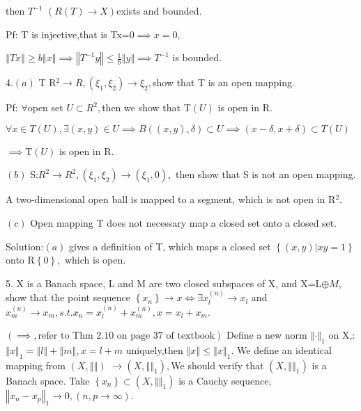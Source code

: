\documentclass{ctexart}
\begin{document}
then $T^{-1}$ $\left( R\left( T\right) \rightarrow X\right) $exists and
bounded.

Pf: T is injective,that is Tx=0$\implies x=0,$

\bigskip $\left\Vert Tx\right\Vert \geq b\left\Vert x\right\Vert \implies
\left\Vert T^{-1}y\right\Vert \leq \frac{1}{b}\left\Vert y\right\Vert
\implies T^{-1}$ is bounded.

4.$\left( a\right) $ T R$^{2}\rightarrow R,\left( \xi _{1},\xi _{2}\right)
\rightarrow \xi _{2},$show that T is an open mapping.

Pf: $\forall $open set $U\subset R^{2},$then we show that T$\left( U\right) $
is open in R.

$\forall x\in T\left( U\right) ,\exists \left( x,y\right) \in U\implies
B\left( \left( x,y\right) ,\delta \right) \subset U\implies \left( x-\delta
,x+\delta \right) \subset T\left( U\right) $

$\implies $T$\left( U\right) $ is open in R.

$\left( b\right) $ S:$R^{2}\rightarrow R^{2},\left( \xi _{1},\xi _{2}\right)
\rightarrow \left( \xi _{1},0\right) ,$ then show that S is not an open
mapping.

A two-dimensional open ball is mapped to a segment, which is not open in R$%
^{2}.$

$\left( c\right) $ Open mapping T does not necessary map a closed set onto a
closed set.

Solution:$\left( a\right) $ gives a definition of T, which maps a closed set 
$\left\{ \left( x,y\right) |xy=1\right\} $ onto R\TEXTsymbol{\backslash}$%
\left\{ 0\right\} ,$ which is open.

5. X is a Banach space, L and M are two closed subspaces of X, and X=L$%
\oplus M,$show that the point sequence $\left\{ x_{n}\right\} \rightarrow
x\iff \exists x_{l}^{\left( n\right) }\rightarrow x_{l}$ and $x_{m}^{\left(
n\right) }\rightarrow x_{m},s.t.x_{n}=x_{l}^{\left( n\right) }+x_{m}^{\left(
n\right) },x=x_{l}+x_{m}.$

$\left( \implies ,\text{refer to Thm 2.10 on page 37 of textbook}\right) $%
Define a new norm $\left\Vert \cdot \right\Vert _{1}$ on X,:$\left\Vert
x\right\Vert _{1}=\left\Vert l\right\Vert +\left\Vert m\right\Vert ,x=l+m$
uniquely,then $\left\Vert x\right\Vert \leq \left\Vert x\right\Vert _{1}.$
We define an identical mapping from $\left( X,\left\Vert {}\right\Vert
\right) $ $\rightarrow \left( X,\left\Vert {}\right\Vert _{1}\right) ,$We
should verify that $\left( X,\left\Vert {}\right\Vert _{1}\right) $ is a
Banach space. Take $\left\{ x_{n}\right\} \subset \left( X,\left\Vert
{}\right\Vert _{1}\right) $ is a Cauchy sequence, $\left\Vert
x_{n}-x_{p}\right\Vert _{1}\rightarrow 0,\left( n,p\rightarrow \infty
\right) .$
\end{document}
